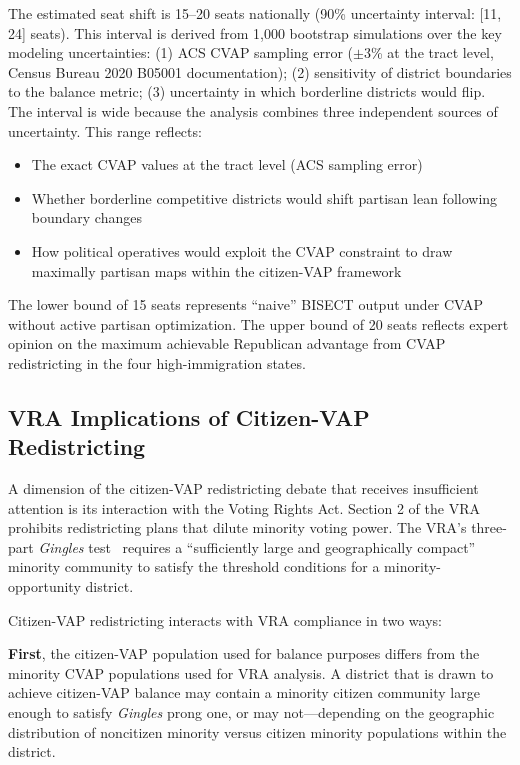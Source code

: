 The estimated seat shift is 15--20 seats nationally (90\% uncertainty interval:
[11, 24] seats).
This interval is derived from 1{,}000 bootstrap simulations over the key
modeling uncertainties: (1) ACS CVAP sampling error ($\pm$3\% at the tract level,
Census Bureau 2020 B05001 documentation); (2) sensitivity of district boundaries to
the balance metric; (3) uncertainty in which borderline districts would flip.
The interval is wide because the analysis combines three independent sources of
uncertainty. This range reflects:
\begin{itemize}
    \item The exact CVAP values at the tract level (ACS sampling error)
    \item Whether borderline competitive districts would shift partisan lean following boundary changes
    \item How political operatives would exploit the CVAP constraint to draw maximally partisan maps within the citizen-VAP framework
\end{itemize}

The lower bound of 15 seats represents ``naive'' BISECT output under CVAP without active partisan optimization. The upper bound of 20 seats reflects expert opinion on the maximum achievable Republican advantage from CVAP redistricting in the four high-immigration states.

\subsection{VRA Implications of Citizen-VAP Redistricting}

A dimension of the citizen-VAP redistricting debate that receives insufficient attention is its interaction with the Voting Rights Act. Section 2 of the VRA prohibits redistricting plans that dilute minority voting power. The VRA's three-part \emph{Gingles} test~\citep{gingles1986} requires a ``sufficiently large and geographically compact'' minority community to satisfy the threshold conditions for a minority-opportunity district.

Citizen-VAP redistricting interacts with VRA compliance in two ways:

\textbf{First}, the citizen-VAP population used for balance purposes differs from the minority CVAP populations used for VRA analysis. A district that is drawn to achieve citizen-VAP balance may contain a minority citizen community large enough to satisfy \emph{Gingles} prong one, or may not---depending on the geographic distribution of noncitizen minority versus citizen minority populations within the district.

